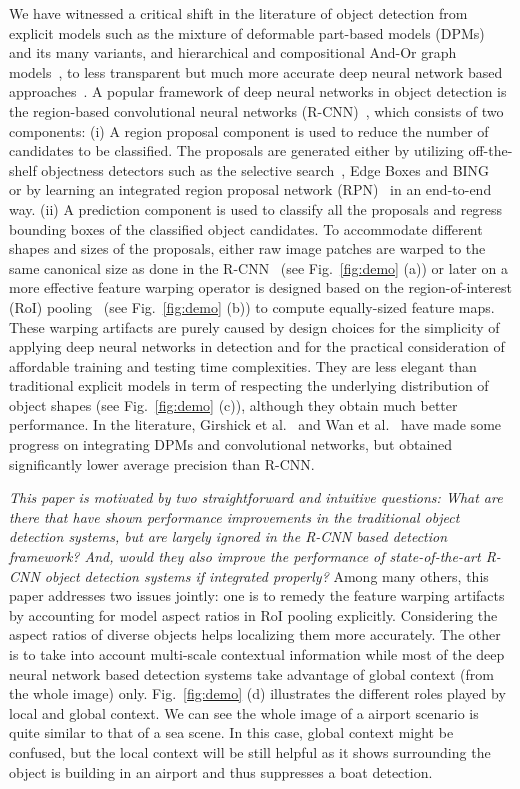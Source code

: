 \documentclass[10pt,twocolumn,letterpaper]{article}
\begin{document}
We have witnessed a critical shift in the literature of object detection from explicit models such as the mixture of deformable part-based models (DPMs)~\cite{DPM} and its many variants, and hierarchical and compositional And-Or graph models~\cite{carAOG}, to less transparent but much more accurate deep neural network based approaches~\cite{lecun89,rcnn,fast_rcnn,faster_rcnn,resNet,googlenet,yolo,ssd,rfcn}. A popular framework of deep neural networks in object detection is the region-based convolutional neural networks (R-CNN)~\cite{rcnn}, which consists of two components: (i) A region proposal component is used to reduce the number of candidates to be classified. 
The proposals are generated  either by utilizing off-the-shelf objectness detectors such as the selective search~\cite{SS}, Edge Boxes \cite{edge_boxes} and BING~\cite{BING} or by learning an integrated region proposal network (RPN)~\cite{faster_rcnn} in an end-to-end way.
(ii) A prediction component is used to classify all the proposals and regress  bounding boxes of the classified object candidates. To accommodate different shapes and sizes of the proposals, either raw image patches are warped to the same canonical size as done in the R-CNN~\cite{rcnn} (see Fig.~\ref{fig:demo} (a)) or later on a more effective feature warping operator is designed based on the region-of-interest (RoI) pooling~\cite{fast_rcnn} (see Fig.~\ref{fig:demo} (b)) to compute equally-sized feature maps. These warping artifacts are purely caused by design choices for the simplicity of applying deep neural networks in detection and for the practical consideration of affordable training and testing time complexities. They are less elegant than traditional explicit models in term of respecting the underlying distribution of object shapes (see Fig.~\ref{fig:demo} (c)), although they obtain much better performance. In the literature, Girshick et al.~\cite{dpdpm} and Wan et al.~\cite{wanli} have made some progress on integrating DPMs and convolutional networks, but obtained significantly lower average precision than R-CNN.

\textit{This paper is motivated by two straightforward and intuitive questions: What are there that have shown performance improvements in the traditional object detection systems, but are largely ignored in the R-CNN based detection framework? And, would they also improve the performance of state-of-the-art R-CNN object detection systems if integrated properly?} 
Among many others, this paper addresses two issues jointly: one is to remedy the feature warping artifacts by accounting for model aspect ratios in RoI pooling explicitly. Considering the aspect ratios of diverse objects helps localizing them more accurately. 
The other is to take into account multi-scale contextual information while most of the deep neural network based detection systems take advantage of global context (from the whole image) only. Fig.~\ref{fig:demo} (d) illustrates the different roles played by local and global context. We can see the whole image of a airport scenario is quite similar to that of a sea scene. In this case, global context might be confused, but the local context will be still helpful as it shows surrounding the object is building in an airport and thus suppresses a boat detection.
\end{document}
